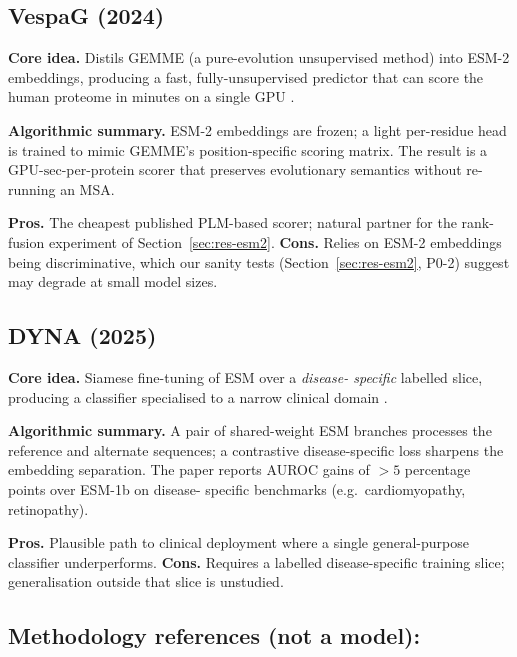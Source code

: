 \documentclass[11pt,a4paper,oneside]{report}
\begin{document}
\subsection{VespaG (2024) \texorpdfstring{\citep{marquet2024vespag}}{(Marquet et al., 2024)}}
\label{sec:rw-vespag}

\textbf{Core idea.} Distils GEMME (a pure-evolution unsupervised method)
into ESM-2 embeddings, producing a fast, fully-unsupervised predictor
that can score the human proteome in minutes on a single GPU
\citep{marquet2024vespag}.

\textbf{Algorithmic summary.} ESM-2 embeddings are frozen; a light
per-residue head is trained to mimic GEMME's position-specific
scoring matrix. The result is a $\text{GPU-sec}$-per-protein scorer
that preserves evolutionary semantics without re-running an MSA.

\textbf{Pros.} The cheapest published PLM-based scorer; natural
partner for the rank-fusion experiment of Section~\ref{sec:res-esm2}.
\textbf{Cons.} Relies on ESM-2 embeddings being discriminative, which
our sanity tests (Section~\ref{sec:res-esm2}, P0-2) suggest may
degrade at small model sizes.

\subsection{DYNA (2025) \texorpdfstring{\citep{zhan2025dyna}}{(Zhan et al., 2025)}}
\label{sec:rw-dyna}

\textbf{Core idea.} Siamese fine-tuning of ESM over a \emph{disease-
specific} labelled slice, producing a classifier specialised to a
narrow clinical domain \citep{zhan2025dyna}.

\textbf{Algorithmic summary.} A pair of shared-weight ESM branches
processes the reference and alternate sequences; a contrastive
disease-specific loss sharpens the embedding separation. The paper
reports AUROC gains of $>5$ percentage points over ESM-1b on disease-
specific benchmarks (e.g.\ cardiomyopathy, retinopathy).

\textbf{Pros.} Plausible path to clinical deployment where a single
general-purpose classifier underperforms. \textbf{Cons.} Requires a
labelled disease-specific training slice; generalisation outside
that slice is unstudied.

\subsection{Methodology references (not a model):
\texorpdfstring{\citep{livesey2023benchmark_v2, notin2023proteingym_v2}}%
{Livesey \& Marsh 2023; ProteinGym 2023}}
\label{sec:rw-methodology-refs}
\end{document}
